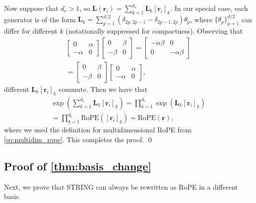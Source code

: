 Now suppose that $d_c > 1$, so $\mathbf{L}(\boldsymbol{r}_i) = \sum_{k=1}^{d_c} \mathbf{L}_k [\boldsymbol{r}_i]_k$.
In our special case, each generator is of the form $\mathbf{L}_k =  \sum_{p=1}^{d/2} (\delta_{2p,2p-1} - \delta_{2p-1,2p}) \theta_p$, where $\{\theta_p\}_{p=1}^{d/2}$ can differ for different $k$ (notationally suppressed for compactness).
Observing that 
\begin{equation}
\begin{multlined}
\begin{bmatrix}
0 & \alpha \\
-\alpha & 0
\end{bmatrix}
\begin{bmatrix}
0 & \beta \\
-\beta & 0
\end{bmatrix} = 
\begin{bmatrix}
-\alpha \beta & 0 \\
0 & -\alpha \beta 
\end{bmatrix} \\
= \begin{bmatrix}
0 & \beta \\
-\beta & 0
\end{bmatrix}
\begin{bmatrix}
0 & \alpha \\
-\alpha & 0
\end{bmatrix},
\end{multlined}
\end{equation}
different $\mathbf{L}_k[\mathbf{r}_i]_k$ commute.
Then we have that
\begin{equation}
\begin{multlined}
    \exp\left(\sum_{k=1}^{d_c} \mathbf{L}_k[\mathbf{r}_i]_k\right) = \prod_{k=1}^{d_c}   \exp\left( \mathbf{L}_k[\mathbf{r}_i]_k\right) \\ =\prod_{k=1}^{d_c}  \textrm{RoPE}([\mathbf{r}_i]_k) = \textrm{RoPE}(\mathbf{r}),
\end{multlined}
\end{equation}
where we used the definition for multidimensional RoPE from \cref{eq:multidim_rope}.
This completes the proof. \qed

\subsection{Proof of \cref{thm:basis_change}} \label{app:basis-change}
Next, we prove that STRING can always be rewritten as RoPE in a different basis. 

